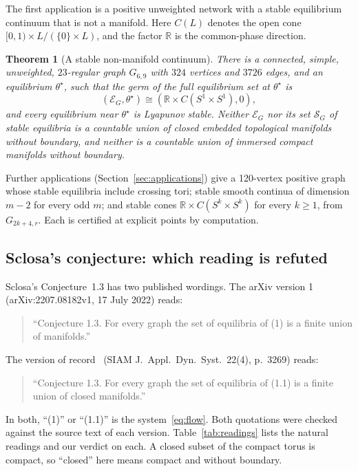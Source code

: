 \documentclass[11pt,a4paper]{article}
\newtheorem{theorem}{Theorem}
\theoremstyle{definition}\newtheorem{conjecture}{Conjecture}
\theoremstyle{remark}\newtheorem{remark}[theorem]{Remark}
\newcommand{\R}{\mathbb R}
\newcommand{\E}{\mathcal E}
\newcommand{\Sset}{\mathcal S}
\begin{document}
The first application is a positive unweighted network with a stable equilibrium continuum that is not a manifold. Here $C(L)$ denotes the open cone $[0,1)\times L/(\{0\}\times L)$, and the factor $\R$ is the common-phase direction.

\begin{theorem}[A stable non-manifold continuum]\label{thm:stable}
There is a connected, simple, unweighted, $23$-regular graph $G_{6,9}$ with $324$ vertices and $3726$ edges, and an equilibrium $\theta^\star$, such that the germ of the full equilibrium set at $\theta^\star$ is
\begin{equation}\label{eq:stablecone}
 (\E_{G},\theta^\star)\cong(\R\times C(S^1\times S^1),0),
\end{equation}
and every equilibrium near $\theta^\star$ is Lyapunov stable. Neither $\E_G$ nor its set $\Sset_G$ of stable equilibria is a countable union of closed embedded topological manifolds without boundary, and neither is a countable union of immersed compact manifolds without boundary.
\end{theorem}

Further applications (Section~\ref{sec:applications}) give a 120-vertex positive graph whose stable equilibria include crossing tori; stable smooth continua of dimension $m-2$ for every odd $m$; and stable cones $\R\times C(S^{k}\times S^{k})$ for every $k\ge1$, from $G_{2k+4,r}$. Each is certified at explicit points by computation.

\subsection{Sclosa's conjecture: which reading is refuted}

Sclosa's Conjecture~1.3 has two published wordings. The arXiv version 1 (arXiv:2207.08182v1, 17 July 2022) reads:
\begin{quote}
``Conjecture 1.3. For every graph the set of equilibria of (1) is a finite union of manifolds.''
\end{quote}
The version of record~\cite{sclosa23} (SIAM J.\ Appl.\ Dyn.\ Syst.\ 22(4), p.~3269) reads:
\begin{quote}
``Conjecture 1.3. For every graph the set of equilibria of (1.1) is a finite union of closed manifolds.''
\end{quote}
In both, ``(1)'' or ``(1.1)'' is the system~\eqref{eq:flow}. Both quotations were checked against the source text of each version. Table~\ref{tab:readings} lists the natural readings and our verdict on each. A closed subset of the compact torus is compact, so ``closed'' here means compact and without boundary.
\end{document}
